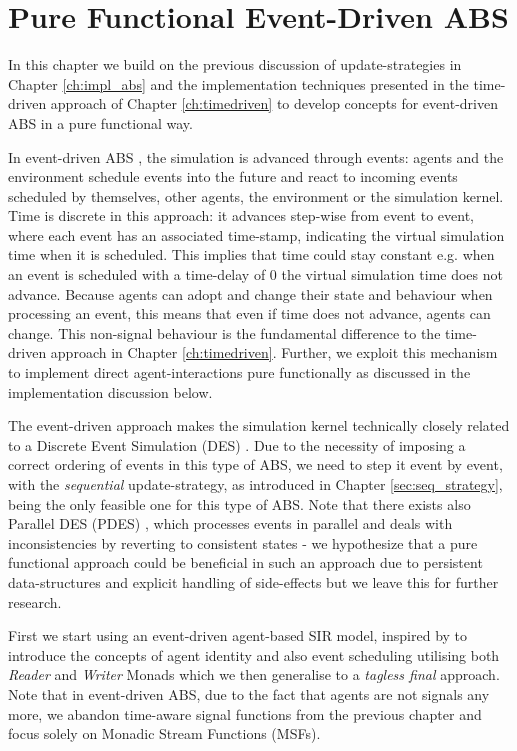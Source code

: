 \chapter{Pure Functional Event-Driven ABS}
\label{ch:eventdriven}

In this chapter we build on the previous discussion of update-strategies in Chapter \ref{ch:impl_abs} and the implementation techniques presented in the time-driven approach of Chapter \ref{ch:timedriven} to develop concepts for event-driven ABS in a pure functional way. 

In event-driven ABS \cite{meyer_event-driven_2014}, the simulation is advanced through events: agents and the environment schedule events into the future and react to incoming events scheduled by themselves, other agents, the environment or the simulation kernel. Time is discrete in this approach: it advances step-wise from event to event, where each event has an associated time-stamp, indicating the virtual simulation time when it is scheduled. This implies that time could stay constant e.g. when an event is scheduled with a time-delay of 0 the virtual simulation time does not advance. Because agents can adopt and change their state and behaviour when processing an event, this means that even if time does not advance, agents can change. This non-signal behaviour is the fundamental difference to the time-driven approach in Chapter \ref{ch:timedriven}. Further, we exploit this mechanism to implement direct agent-interactions pure functionally as discussed in the implementation discussion below.

The event-driven approach makes the simulation kernel technically closely related to a Discrete Event Simulation (DES) \cite{zeigler_theory_2000}. Due to the necessity of imposing a correct ordering of events in this type of ABS, we need to step it event by event, with the \textit{sequential} update-strategy, as introduced in Chapter \ref{sec:seq_strategy}, being the only feasible one for this type of ABS. Note that there exists also Parallel DES (PDES) \cite{fujimoto_parallel_1990}, which processes events in parallel and deals with inconsistencies by reverting to consistent states - we hypothesize that a pure functional approach could be beneficial in such an approach due to persistent data-structures and explicit handling of side-effects but we leave this for further research.

\medskip

First we start using an event-driven agent-based SIR model, inspired by \cite{macal_agent-based_2010} to introduce the concepts of agent identity and also event scheduling utilising both \textit{Reader} and \textit{Writer} Monads which we then generalise to a \textit{tagless final} approach. Note that in event-driven ABS, due to the fact that agents are not signals any more, we abandon time-aware signal functions from the previous chapter and focus solely on Monadic Stream Functions (MSFs).

